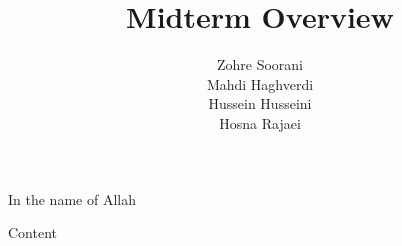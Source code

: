 \documentclass[aspectratio=169, dvipsnames, svgnames, x11names]{beamer}
\title{Midterm Overview}
\author{
Zohre Soorani\\
Mahdi Haghverdi\\
Hussein Husseini\\
Hosna Rajaei\\
}
\institute{
    \\\texttt{[image: logos/logo]}\\
    Isfahan University
}
\begin{document}
\begin{frame}[plain]
\begin{center}
In the name of Allah
\end{center}
\maketitle
\end{frame}

\setcounter{framenumber}{0}
\raggedleft

\begin{frame}{Content}
\begin{flushleft}
\tableofcontents
\end{flushleft}
\end{frame}




\end{document}
